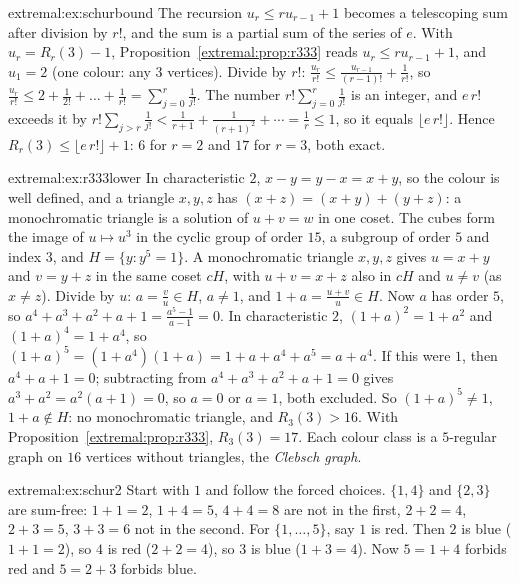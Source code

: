 \begin{solution}{extremal:ex:schurbound}
\idea The recursion $u_r\le ru_{r-1}+1$ becomes a telescoping sum after division by $r!$, and the sum is a partial sum of the series of $e$.
\writeup With $u_r=R_r(3)-1$, Proposition~\ref{extremal:prop:r333} reads $u_r\le ru_{r-1}+1$, and $u_1=2$ (one colour: any $3$ vertices). Divide by $r!$: $\frac{u_r}{r!}\le\frac{u_{r-1}}{(r-1)!}+\frac1{r!}$, so
$\frac{u_r}{r!}\le2+\frac1{2!}+\dots+\frac1{r!}=\sum_{j=0}^r\frac1{j!}$. The number $r!\sum_{j=0}^r\frac1{j!}$ is an integer, and $e\,r!$ exceeds it by $r!\sum_{j>r}\frac1{j!}<\frac1{r+1}+\frac1{(r+1)^2}+\cdots=\frac1r\le1$, so it equals
$\lfloor e\,r!\rfloor$. Hence $R_r(3)\le\lfloor e\,r!\rfloor+1$: $6$ for $r=2$ and $17$ for $r=3$, both exact.
\end{solution}

\begin{solution}{extremal:ex:r333lower}
\idea In characteristic $2$, $x-y=y-x=x+y$, so the colour is well defined, and a triangle $x,y,z$ has $(x+z)=(x+y)+(y+z)$: a monochromatic triangle is a solution of $u+v=w$ in one coset.
\writeup The cubes form the image of $u\mapsto u^3$ in the cyclic group of order $15$, a subgroup of order $5$ and index $3$, and $H=\{y:y^5=1\}$. A monochromatic triangle $x,y,z$ gives $u=x+y$ and
$v=y+z$ in the same coset $cH$, with $u+v=x+z$ also in $cH$ and $u\ne v$ (as $x\ne z$). Divide by $u$: $a=\frac vu\in H$, $a\ne1$, and $1+a=\frac{u+v}u\in H$. Now $a$ has order $5$, so
$a^4+a^3+a^2+a+1=\frac{a^5-1}{a-1}=0$. In characteristic $2$, $(1+a)^2=1+a^2$ and $(1+a)^4=1+a^4$, so $(1+a)^5=(1+a^4)(1+a)=1+a+a^4+a^5=a+a^4$. If this were $1$, then $a^4+a+1=0$; subtracting from
$a^4+a^3+a^2+a+1=0$ gives $a^3+a^2=a^2(a+1)=0$, so $a=0$ or $a=1$, both excluded. So $(1+a)^5\ne1$, $1+a\notin H$: no monochromatic triangle, and $R_3(3)>16$. With Proposition~\ref{extremal:prop:r333},
$R_3(3)=17$. Each colour class is a $5$-regular graph on $16$ vertices without triangles, the \emph{Clebsch graph}.
\end{solution}

\begin{solution}{extremal:ex:schur2}
\idea Start with $1$ and follow the forced choices.
\writeup $\{1,4\}$ and $\{2,3\}$ are sum-free: $1+1=2$, $1+4=5$, $4+4=8$ are not in the first, $2+2=4$, $2+3=5$, $3+3=6$ not in the second. For $\{1,\dots,5\}$, say $1$ is red. Then $2$ is blue
($1+1=2$), so $4$ is red ($2+2=4$), so $3$ is blue ($1+3=4$). Now $5=1+4$ forbids red and $5=2+3$ forbids blue.
\end{solution}

